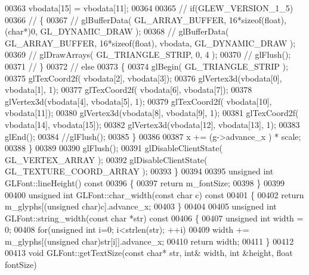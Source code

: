 \begin{DoxyCode}
00363         vbodata[15] = vbodata[11];
00364 
00365 \textcolor{comment}{//        if(GLEW\_VERSION\_1\_5)}
00366 \textcolor{comment}{//        \{}
00367 \textcolor{comment}{//            glBufferData( GL\_ARRAY\_BUFFER, 16*sizeof(float), (char*)0, GL\_DYNAMIC\_DRAW );}
00368 \textcolor{comment}{//            glBufferData( GL\_ARRAY\_BUFFER, 16*sizeof(float), vbodata, GL\_DYNAMIC\_DRAW );}
00369 \textcolor{comment}{//            glDrawArrays( GL\_TRIANGLE\_STRIP, 0, 4 );}
00370 \textcolor{comment}{//            glFlush();}
00371 \textcolor{comment}{//        \}}
00372 \textcolor{comment}{//        else}
00373         \{
00374             glBegin( GL_TRIANGLE_STRIP );
00375             glTexCoord2f( vbodata[2], vbodata[3]);
00376             glVertex3d(vbodata[0], vbodata[1], 1);
00377             glTexCoord2f( vbodata[6], vbodata[7]);
00378             glVertex3d(vbodata[4], vbodata[5], 1);
00379             glTexCoord2f( vbodata[10], vbodata[11]);
00380             glVertex3d(vbodata[8], vbodata[9], 1);
00381             glTexCoord2f( vbodata[14], vbodata[15]);
00382             glVertex3d(vbodata[12], vbodata[13], 1);
00383             glEnd();
00384             \textcolor{comment}{//glFlush();}
00385         \}
00386 
00387         x += (g->advance_x ) * scale;
00388     \}
00389 
00390     glFlush();
00391     glDisableClientState( GL_VERTEX_ARRAY );
00392     glDisableClientState( GL_TEXTURE_COORD_ARRAY );
00393 \}
00394 
00395 \textcolor{keywordtype}{unsigned} \textcolor{keywordtype}{int} GLFont::lineHeight()\textcolor{keyword}{ const}
00396 \textcolor{keyword}{}\{
00397     \textcolor{keywordflow}{return} m_fontSize;
00398 \}
00399 
00400 \textcolor{keywordtype}{unsigned} \textcolor{keywordtype}{int} GLFont::char_width(\textcolor{keyword}{const} \textcolor{keywordtype}{char} c)\textcolor{keyword}{ const}
00401 \textcolor{keyword}{}\{
00402     \textcolor{keywordflow}{return} m_glyphs[(\textcolor{keywordtype}{unsigned} char)c].advance\_x;
00403 \}
00404 
00405 \textcolor{keywordtype}{unsigned} \textcolor{keywordtype}{int} GLFont::string_width(\textcolor{keyword}{const} \textcolor{keywordtype}{char} *str)\textcolor{keyword}{ const}
00406 \textcolor{keyword}{}\{
00407     \textcolor{keywordtype}{unsigned} \textcolor{keywordtype}{int} width = 0;
00408     \textcolor{keywordflow}{for}(\textcolor{keywordtype}{unsigned} \textcolor{keywordtype}{int} i=0; i<strlen(str); ++i)
00409         width += m_glyphs[(\textcolor{keywordtype}{unsigned} \textcolor{keywordtype}{char})str[i]].advance_x;
00410     \textcolor{keywordflow}{return} width;
00411 \}
00412 
00413 \textcolor{keywordtype}{void} GLFont::getTextSize(\textcolor{keyword}{const} \textcolor{keywordtype}{char}* str, \textcolor{keywordtype}{int}& width, \textcolor{keywordtype}{int} &height, \textcolor{keywordtype}{float} fontSize)

\end{DoxyCode}

